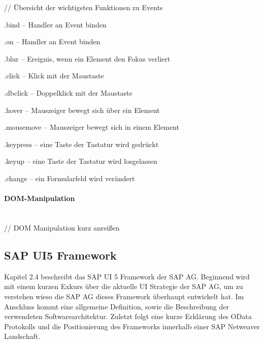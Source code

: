 // Übersicht der wichtigsten Funktionen zu Events
	\vspace{1em}
    \begin{compactitem}
	    \item .bind – Handler an Event binden
	    \item .on – Handler an Event binden
	    \item .blur – Ereignis, wenn ein Element den Fokus verliert
	    \item .click – Klick mit der Maustaste
	    \item .dbclick – Doppelklick mit der Maustaste
	    \item .hover – Mauszeiger bewegt sich über ein Element
	    \item .mousemove – Mauszeiger bewegt sich in einem Element
	    \item .keypress – eine Taste der Tastatur wird gedrückt
	    \item .keyup – eine Taste der Tastatur wird losgelassen
	    \item .change – ein Formularfeld wird verändert
    \end{compactitem}
    
\paragraph{DOM-Manipulation}$\;$ \\
// DOM Manipulation kurz anreißen\\


\subsection{SAP UI5 Framework}
Kapitel 2.4 beschreibt das SAP UI 5 Framework der SAP AG. Beginnend wird mit einem kurzen Exkurs über die aktuelle UI Strategie der SAP AG, um zu verstehen wieso die SAP AG dieses Framework überhaupt entwickelt hat. Im Anschluss kommt eine allgemeine Definition, sowie die Beschreibung der verwendeten Softwarearchitektur. Zuletzt folgt eine kurze Erklärung des OData Protokolls und die Positionierung des Frameworks innerhalb einer SAP Netweaver Landschaft.

